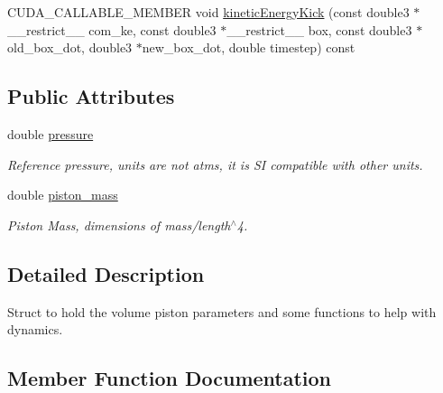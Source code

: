 \begin{DoxyCompactItemize}
\item 
C\+U\+D\+A\+\_\+\+C\+A\+L\+L\+A\+B\+L\+E\+\_\+\+M\+E\+M\+B\+ER void \hyperlink{structVolumePiston_af199572d24c18206fa173f6f24c637f5}{kinetic\+Energy\+Kick} (const double3 $\ast$\+\_\+\+\_\+restrict\+\_\+\+\_\+ com\+\_\+ke, const double3 $\ast$\+\_\+\+\_\+restrict\+\_\+\+\_\+ box, const double3 $\ast$old\+\_\+box\+\_\+dot, double3 $\ast$new\+\_\+box\+\_\+dot, double timestep) const
\end{DoxyCompactItemize}
\subsection*{Public Attributes}
\begin{DoxyCompactItemize}
\item 
double \hyperlink{structVolumePiston_aff364bf76db0d8e73d251dccf2301193}{pressure}
\begin{DoxyCompactList}\small\item\em Reference pressure, units are not atms, it is SI compatible with other units. \end{DoxyCompactList}\item 
double \hyperlink{structVolumePiston_a831ba454760bec711a2823f432b21840}{piston\+\_\+mass}
\begin{DoxyCompactList}\small\item\em Piston Mass, dimensions of mass/length$^\wedge$4. \end{DoxyCompactList}\end{DoxyCompactItemize}


\subsection{Detailed Description}
Struct to hold the volume piston parameters and some functions to help with dynamics. 



\subsection{Member Function Documentation}
\hypertarget{structVolumePiston_af199572d24c18206fa173f6f24c637f5}{}\label{structVolumePiston_af199572d24c18206fa173f6f24c637f5} 
